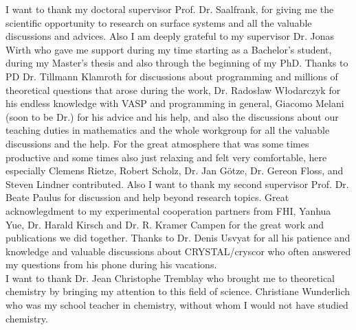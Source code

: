 \documentclass[11pt,DIV=13,BCOR=5mm,a4paper,headinclude]{scrbook}
\begin{document}

\begingroup
\renewcommand{\cleardoublepage}{}
\clearpage
{}
\endgroup
I want to thank my doctoral supervisor Prof. Dr. Saalfrank, for giving me the scientific opportunity to research on surface systems and all the valuable discussions and advices.
Also I am deeply grateful to my supervisor Dr. Jonas Wirth who gave me support during my time starting as a Bachelor's student, during my Master's thesis and also through the beginning of my PhD.
Thanks to PD Dr. Tillmann Klamroth for discussions about programming and millions of theoretical questions that arose during the work, Dr. Rados\l{}aw W\l{}odarczyk for his endless knowledge with VASP and programming in general, Giacomo Melani (soon to be Dr.) for his advice and his help, and also the discussions about our teaching duties in mathematics and the whole workgroup for all the valuable discussions and the help.
For the great atmosphere that was some times productive and some times also just relaxing and felt very comfortable, here especially Clemens Rietze, Robert Scholz, Dr. Jan Götze, Dr. Gereon Floss, and Steven Lindner contributed.
Also I want to thank my second supervisor Prof. Dr. Beate Paulus for discussion and help beyond research topics.
Great acknowlegdment to my experimental cooperation partners from FHI, Yanhua Yue, Dr. Harald Kirsch and Dr. R. Kramer Campen for the great work and publications we did together.
Thanks to Dr. Denis Usvyat for all his patience and knowledge and valuable discussions about CRYSTAL/cryscor who often answered my questions from his phone during his vacations.\\
I want to thank Dr. Jean Christophe Tremblay who brought me to theoretical chemistry by bringing my attention to this field of science.
Christiane Wunderlich who was my school teacher in chemistry, without whom I would not have studied chemistry.
\end{document}
